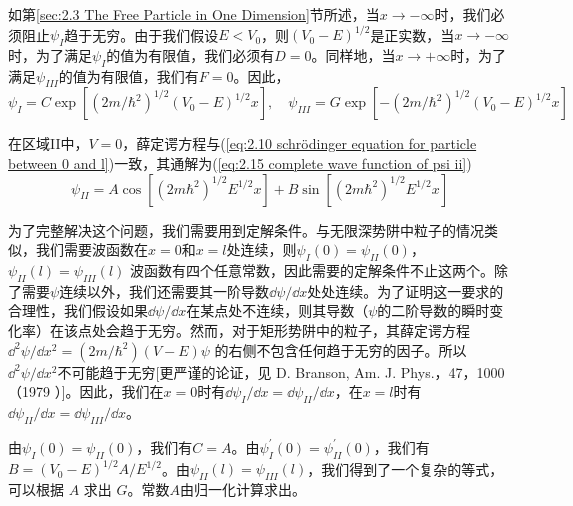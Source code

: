 	如第\ref{sec:2.3 The Free Particle in One Dimension}节所述，当$x \to -\infty$时，我们必须阻止$\psi_I$趋于无穷。由于我们假设$E<V_0$，则$\left(V_0-E\right)^{1/2}$是正实数，当$x \to -\infty$时，为了满足$\psi_I$的值为有限值，我们必须有$D=0$。同样地，当$x \to +\infty$时，为了满足$\psi_{III}$的值为有限值，我们有$F=0$。因此，
	\begin{equation*}
		\psi_I  = C \exp \left[\left(2m/\hbar^2\right)^{1/2}\left(V_0-E\right)^{1/2}x\right] , \quad \psi_{III}  = G \exp \left[-\left(2m/\hbar^2\right)^{1/2}\left(V_0-E\right)^{1/2}x\right]
	\end{equation*}

	在区域II中，$V=0$，薛定谔方程与(\ref{eq:2.10 schrödinger equation for particle between 0 and l})一致，其通解为(\ref{eq:2.15 complete wave function of psi ii})
	\begin{equation}
		\psi_{II} = A \cos\left[\left(2m\hbar^2\right)^{1/2}E^{1/2}x\right]+B\sin \left[\left(2m\hbar^2\right)^{1/2}E^{1/2}x\right]
		\label{eq:2.32}
	\end{equation}

	为了完整解决这个问题，我们需要用到定解条件。与无限深势阱中粒子的情况类似，我们需要波函数在$x=0$和$x=l$处连续，则$\psi_I\left(0\right) = \psi_{II}\left(0\right)$，$\psi_{II}\left(l\right) = \psi_{III}\left(l\right)$
	波函数有四个任意常数，因此需要的定解条件不止这两个。除了需要$\psi$连续以外，我们还需要其一阶导数$\dd \psi/\dd x$处处连续。为了证明这一要求的合理性，我们假设如果$\dd \psi/\dd x$在某点处不连续，则其导数（$\psi$的二阶导数的瞬时变化率）在该点处会趋于无穷。然而，对于矩形势阱中的粒子，其薛定谔方程$\dd ^2\psi/\dd x^2=\left(2m/\hbar^2\right)\left(V-E\right)\psi$
	的右侧不包含任何趋于无穷的因子。所以$\dd ^2\psi/\dd x^2$不可能趋于无穷[更严谨的论证，见 D. Branson, Am. J. Phys.，47，1000（1979 ）]。因此，我们在$x=0$时有$\dd \psi_I/\dd x=\dd \psi_{II}/\dd x$，在$x=l$时有$\dd \psi_{II}/\dd x=\dd \psi_{III}/\dd x$。

	由$\psi_I\left(0\right) = \psi_{II}\left(0\right)$，我们有$C=A$。由$\psi_I^{\prime}\left(0\right) = \psi_{II}^{\prime}\left(0\right)$，我们有$B=\left(V_0-E\right)^{1/2}A/E^{1/2}$。由$\psi_{II}\left(l\right) = \psi_{III}\left(l\right)$，我们得到了一个复杂的等式，可以根据 $A$ 求出 $G$。常数$A$由归一化计算求出。

